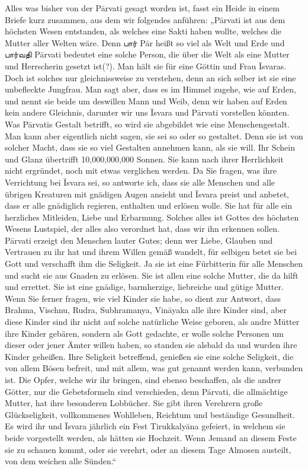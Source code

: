 \documentclass{article}
\newcommand{\TamilText}[1]{\texttamil{#1}}
\newcommand{\tam}[1]{\TamilText{#1}}
\begin{document}
Alles was bisher von der P\={a}rvati gesagt worden ist, fasst ein Heide in einem Briefe kurz zusammen, aus dem wir folgendes anführen: „P\={a}rvati ist aus dem höchsten Wesen entstanden, als welches eine Sakti haben wollte, welches die Mutter aller Welten wäre. Denn \tam{பார்} P\={a}r heißt so viel als Welt und Erde und \tam{பார்வதி} P\={a}rvati bedeutet eine solche Person, die über die Welt als eine Mutter und Herrscherin gesetzt ist(?). Man hält sie für eine Göttin und Frau \={I}svaras. Doch ist solches nur gleichnissweise zu verstehen, denn an sich selber ist sie eine unbefleckte Jungfrau. Man sagt aber, dass es im Himmel zugehe, wie auf Erden, und nennt sie beide um deswillen Mann und Weib, denn wir haben auf Erden kein andere Gleichnis, darunter wir uns \={I}svara und P\={a}rvati vorstellen könnten. Was P\={a}rvatis Gestalt betrifft, so wird sie abgebildet wie eine Menschengestalt. Man kann aber eigentlich nicht sagen, sie sei so oder so gestaltet. Denn sie ist von solcher Macht, dass sie so viel Gestalten annehmen kann, als sie will. Ihr Schein und Glanz übertrifft 10,000,000,000 Sonnen. Sie kann nach ihrer Herrlichkeit nicht ergründet, noch mit etwas verglichen werden. Da Sie fragen, was ihre Verrichtung bei \={I}svara sei, so antworte ich, dass sie alle Menschen und alle übrigen Kreaturen mit gnädigen Augen ansieht und \={I}svara preist und anbetet, dass er alle gnädiglich regieren, enthalten und erlösen wolle. Sie hat für alle ein herzliches Mitleiden, Liebe und Erbarmung. Solches alles ist Gottes des höchsten Wesens Lustspiel, der alles also verordnet hat, dass wir ihn erkennen sollen. P\={a}rvati erzeigt den Menschen lauter Gutes; denn wer Liebe, Glauben und Vertrauen zu ihr hat und ihrem Willen gemäß wandelt, für selbigen betet sie bei Gott und verschafft ihm die Seligkeit. Ja sie ist eine Fürbitterin für alle Menschen und sucht sie aus Gnaden zu erlösen. Sie ist allen eine solche Mutter, die da hilft und errettet. Sie ist eine gnädige, barmherzige, liebreiche und gütige Mutter. Wenn Sie ferner fragen, wie viel Kinder sie habe, so dient zur Antwort, dass Brahma, Vischnu, Rudra, Subhramanya, Vin\={a}yaka alle ihre Kinder sind, aber diese Kinder sind ihr nicht auf solche natürliche Weise geboren, als andre Mütter ihre Kinder gebären, sondern als Gott gedachte, er wolle solche Personen um dieser oder jener Ämter willen haben, so standen sie alsbald da und wurden ihre Kinder geheißen. Ihre Seligkeit betreffend, genießen sie eine solche Seligkeit, die von allem Bösen befreit, und mit allem, was gut genannt werden kann, verbunden ist. Die Opfer, welche wir ihr bringen, sind ebenso beschaffen, als die andrer Götter, nur die Gebetsformeln sind verschieden, denn P\={a}rvati, die allmächtige Mutter, hat ihre besonderen Lobbücher. Sie gibt ihren Verehrern große Glückseligkeit, vollkommenes Wohlleben, Reichtum und beständige Gesundheit. Es wird ihr und \={I}svara jährlich ein Fest Tirukkaly\={a}na gefeiert, in welchem sie beide vorgestellt werden, als hätten sie Hochzeit. Wenn Jemand an diesem Feste sie zu schauen kommt, oder sie verehrt, oder an diesem Tage Almosen austeilt, von dem weichen alle Sünden.“
\end{document}
